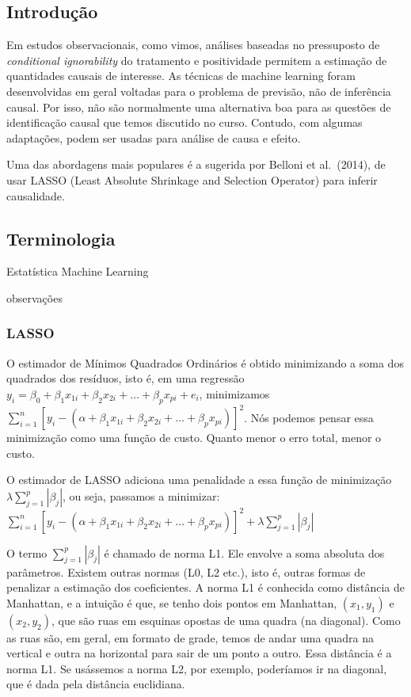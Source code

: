 \documentclass[
]{article}
\begin{document}
\subsection{Introdução}\label{introduuxe7uxe3o-7}

Em estudos observacionais, como vimos, análises baseadas no pressuposto de \emph{conditional ignorability} do tratamento e positividade permitem a estimação de quantidades causais de interesse.
As técnicas de machine learning foram desenvolvidas em geral voltadas para o problema de previsão, não de inferência causal. Por isso, não são normalmente uma alternativa boa para as questões de identificação causal que temos discutido no curso. Contudo, com algumas adaptações, podem ser usadas para análise de causa e efeito.

Uma das abordagens mais populares é a sugerida por Belloni et al.~(2014), de usar LASSO (Least Absolute Shrinkage and Selection Operator) para inferir causalidade.

\subsection{Terminologia}\label{terminologia}

Estatística Machine Learning

observações

\subsubsection{LASSO}\label{lasso}

O estimador de Mínimos Quadrados Ordinários é obtido minimizando a soma dos quadrados dos resíduos, isto é, em uma regressão \(y_i = \beta_0 + \beta_1 x_{1i} + \beta_2 x_{2i} + \ldots + \beta_p x_{pi} + e_i\), minimizamos \(\sum_{i=1}^n [y_i - (\alpha + \beta_1x_{1i} + \beta_2 x_{2i} + \ldots + \beta_px_{pi})]^2\). Nós podemos pensar essa minimização como uma função de custo. Quanto menor o erro total, menor o custo.

O estimador de LASSO adiciona uma penalidade a essa função de minimização \(\lambda \sum_{j=1}^p |\beta_j|\), ou seja, passamos a minimizar: \(\sum_{i=1}^n [y_i - (\alpha + \beta_1x_{1i} + \beta_2x_{2i} + \ldots + \beta_px_{pi})]^2 + \lambda \sum_{j=1}^p |\beta_j|\)

O termo \(\sum_{j=1}^p |\beta_j|\) é chamado de norma L1. Ele envolve a soma absoluta dos parâmetros. Existem outras normas (L0, L2 etc.), isto é, outras formas de penalizar a estimação dos coeficientes. A norma L1 é conhecida como distância de Manhattan, e a intuição é que, se tenho dois pontos em Manhattan, \((x_1, y_1)\) e \((x_2, y_2)\), que são ruas em esquinas opostas de uma quadra (na diagonal). Como as ruas são, em geral, em formato de grade, temos de andar uma quadra na vertical e outra na horizontal para sair de um ponto a outro. Essa distância é a norma L1. Se usássemos a norma L2, por exemplo, poderíamos ir na diagonal, que é dada pela distância euclidiana.
\end{document}
